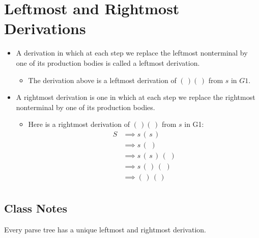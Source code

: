\documentclass[]{article}
\begin{document}
\section{Leftmost and Rightmost Derivations}
  \begin{itemize}
    \item A derivation in which at each step we replace the leftmost nonterminal
    by one of its production bodies is called a leftmost derivation.
      \begin{itemize}
        \item The derivation above is a leftmost derivation of $(\,)(\,)$ from
        $s$ in $G1$.
      \end{itemize}
    \item A rightmost derivation is one in which at each step we replace the
    rightmost nonterminal by one of its production bodies.
      \begin{itemize}
        \item Here is a rightmost derivation of $(\,)(\,)$ from $s$ in G1:
          \begin{align*}
            S & \implies s \, (\,s\,)            \\
              & \implies s \, (\,\,)             \\
              & \implies s \, (\,s\,) \, (\,\,)  \\
              & \implies s \, (\,   ) \, (\,\,)  \\
              & \implies      (\,   ) \, (\,   ) \\ 
          \end{align*}
      \end{itemize}
  \end{itemize}
  \subsection*{Class Notes}
    Every parse tree has a unique leftmost and rightmost derivation.
  
\end{document}
